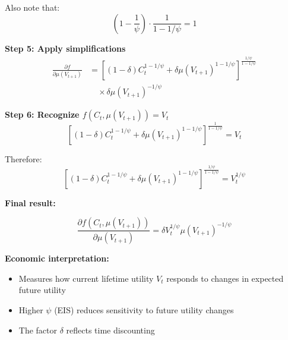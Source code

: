 \documentclass{beamer}
\begin{document}
\begin{frame}[allowframebreaks]
    Also note that:
    \begin{equation*}
        \left(1 - \frac{1}{\psi}\right) \cdot \frac{1}{1-1/\psi} = 1
    \end{equation*}
    
    \framebreak
    
    \textbf{Step 5: Apply simplifications}
    \begin{equation*}
        \begin{aligned}
            \frac{\partial f}{\partial \mu(V_{t+1})} &= \left[ (1-\delta)C_t^{1-1/\psi} + \delta\mu(V_{t+1})^{1-1/\psi} \right]^{\frac{1/\psi}{1-1/\psi}} \\
            &\quad \times \delta \mu(V_{t+1})^{-1/\psi}
        \end{aligned}
    \end{equation*}
    
    \textbf{Step 6: Recognize $f(C_t, \mu(V_{t+1})) = V_t$}
    \begin{equation*}
        \left[ (1-\delta)C_t^{1-1/\psi} + \delta\mu(V_{t+1})^{1-1/\psi} \right]^{\frac{1}{1-1/\psi}} = V_t
    \end{equation*}
    
    Therefore:
    \begin{equation*}
        \left[ (1-\delta)C_t^{1-1/\psi} + \delta\mu(V_{t+1})^{1-1/\psi} \right]^{\frac{1/\psi}{1-1/\psi}} = V_t^{1/\psi}
    \end{equation*}
    
    \framebreak
    
    \textbf{Final result:}
    \begin{tcolorbox}[colback=blue!5!white, colframe=blue!75!black, title=Partial Derivative 1]
    \begin{equation*}
        \frac{\partial f(C_t, \mu(V_{t+1}))}{\partial \mu(V_{t+1})} = \delta V_t^{1/\psi} \mu(V_{t+1})^{-1/\psi}
    \end{equation*}
    \end{tcolorbox}
    
    \textbf{Economic interpretation:}
    \begin{itemize}
        \item Measures how current lifetime utility $V_t$ responds to changes in expected future utility
        \item Higher $\psi$ (EIS) reduces sensitivity to future utility changes
        \item The factor $\delta$ reflects time discounting
    \end{itemize}
\end{frame}
\end{document}
